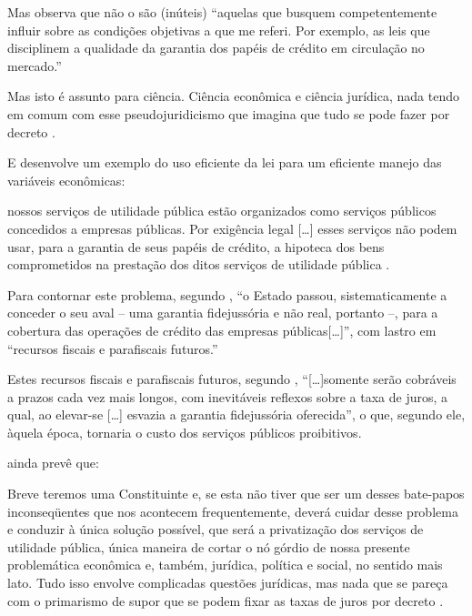 \documentclass[
	10pt,				%
	openright,			%
	twoside,			%
	a5paper,			%
	english,			%
	french,				%
	spanish,			%
	brazil				%
	]{abntex2}
\renewenvironment{quote}
  {\small\list{}{\rightmargin=0.1cm \leftmargin=4cm}%
   \item\relax}
  {\endlist}
\begin{document}
Mas observa que não o são (inúteis) ``aquelas que busquem
competentemente influir sobre as condições objetivas a que me referi.
Por exemplo, as leis que disciplinem a qualidade da garantia dos papéis
de crédito em circulação no mercado.''

\begin{quote}
Mas isto é assunto para ciência. Ciência econômica e ciência jurídica,
nada tendo em comum com esse pseudojuridicismo que imagina que tudo se
pode fazer por decreto \cite[p.~467]{rangel1985b}.
\end{quote}

E desenvolve um exemplo do uso eficiente da lei para um eficiente manejo
das variáveis econômicas:

\begin{quote}
nossos serviços de utilidade pública estão organizados como serviços
públicos concedidos a empresas públicas. Por exigência legal
{[}\ldots{}{]} esses serviços não podem usar, para a garantia de seus
papéis de crédito, a hipoteca dos bens comprometidos na prestação dos
ditos serviços de utilidade pública \cite[p.~469]{rangel1985b}.
\end{quote}

Para contornar este problema, segundo ,
``o Estado passou, sistematicamente a conceder o seu aval -- uma
garantia fidejussória e não real, portanto --, para a cobertura das
operações de crédito das empresas públicas{[}\ldots{}{]}'', com lastro
em ``recursos fiscais e parafiscais futuros.''

Estes recursos fiscais e parafiscais futuros, segundo
, ``{[}\ldots{}{]}somente serão
cobráveis a prazos cada vez mais longos, com inevitáveis reflexos sobre
a taxa de juros, a qual, ao elevar-se {[}\ldots{}{]} esvazia a garantia
fidejussória oferecida'', o que, segundo ele, àquela época, tornaria o
custo dos serviços públicos proibitivos.

 ainda prevê que:

\begin{quote}
Breve teremos uma Constituinte e, se esta não tiver que ser um desses
bate-papos inconseqüentes que nos acontecem frequentemente, deverá
cuidar desse problema e conduzir à única solução possível, que será a
privatização dos serviços de utilidade pública, única maneira de cortar
o nó górdio de nossa presente problemática econômica e, também,
jurídica, política e social, no sentido mais lato. Tudo isso envolve
complicadas questões jurídicas, mas nada que se pareça com o primarismo
de supor que se podem fixar as taxas de juros por decreto
\cite[p.~469]{rangel1985b}.
\end{quote}
\end{document}
